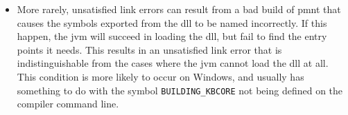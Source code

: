 \begin{itemize}
	\item More rarely, unsatisfied link errors can result from a bad build of \ac{pmnt} that causes the symbols exported from the \ac{dll} to be named incorrectly.  If this happen, the \ac{jvm} will succeed in loading the \ac{dll}, but fail to find the entry points it needs.  This results in an unsatisfied link error that is indistinguishable from the cases where the \ac{jvm} cannot load the \ac{dll} at all.  This condition is more likely to occur on Windows, and usually has something to do with the symbol \verb|BUILDING_KBCORE| not being defined on the compiler command line.
\end{itemize}
